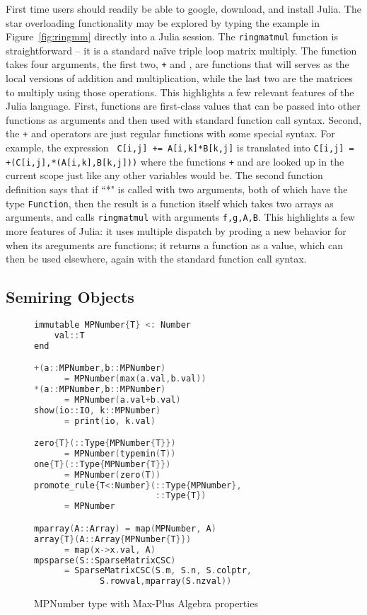 \documentclass[conference]{IEEEtran}
\begin{document}
First time users should readily be able to google, download, and
install Julia.  The star overloading functionality may be explored by
typing the example in Figure~\ref{fig:ringmm} directly into a Julia
session. The {\tt ringmatmul} function is straightforward -- it is a
standard na\"ive triple loop matrix multiply.  The function takes four
arguments, the first two, {\tt +} and {\tt *}, are functions that will
serves as the local versions of addition and multiplication, while the
last two are the matrices to multiply using those operations.  This
highlights a few relevant features of the Julia language.  First,
functions are first-class values that can be passed into other
functions as arguments and then used with standard function call
syntax.  Second, the {\tt +} and {\tt *} operators are just regular
functions with some special syntax.  For example, the expression {\tt
  C[i,j] += A[i,k]*B[k,j]} is translated into {\tt C[i,j] =
  +(C[i,j],*(A[i,k],B[k,j]))} where the functions {\tt +} and {\tt *}
are looked up in the current scope just like any other variables would
be.  The second function definition says that if ``*" is called with
two arguments, both of which have the type {\tt Function}, then the
result is a function itself which takes two arrays as arguments, and
calls {\tt ringmatmul} with arguments {\tt f,g,A,B}.  This highlights
a few more features of Julia: it uses multiple dispatch by proding a
new behavior for {\tt *} when its areguments are functions; it returns
a function as a value, which can then be used elsewhere, again with
the standard function call syntax.

\subsection{Semiring Objects}

\begin{figure}
\begin{lstlisting}[language=c++, frame=single]
immutable MPNumber{T} <: Number
    val::T
end

+(a::MPNumber,b::MPNumber)
      = MPNumber(max(a.val,b.val))
*(a::MPNumber,b::MPNumber)
      = MPNumber(a.val+b.val)
show(io::IO, k::MPNumber)
      = print(io, k.val)

zero{T}(::Type{MPNumber{T}})
      = MPNumber(typemin(T))
one{T}(::Type{MPNumber{T}})
      = MPNumber(zero(T))
promote_rule{T<:Number}(::Type{MPNumber},
                        ::Type{T})
      = MPNumber

mparray(A::Array) = map(MPNumber, A)
array{T}(A::Array{MPNumber{T}})
      = map(x->x.val, A)
mpsparse(S::SparseMatrixCSC)
      = SparseMatrixCSC(S.m, S.n, S.colptr,
             S.rowval,mparray(S.nzval))
\end{lstlisting}
\label{fig:MP}
\caption{MPNumber type with Max-Plus Algebra properties}
\end{figure}
\end{document}

